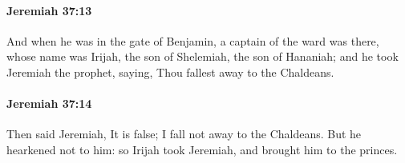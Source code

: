 		\paragraph{Jeremiah 37:13} %
			\label{JEREMIAH-37-13}

			And when he was in the gate of Benjamin, a captain of the ward was there, whose name was Irijah, the son of Shelemiah, the son of Hananiah; and he took Jeremiah the prophet, saying, Thou fallest away to the Chaldeans.


		\paragraph{Jeremiah 37:14} %
			\label{JEREMIAH-37-14}

			Then said Jeremiah, It is false; I fall not away to the Chaldeans. But he hearkened not to him: so Irijah took Jeremiah, and brought him to the princes.


